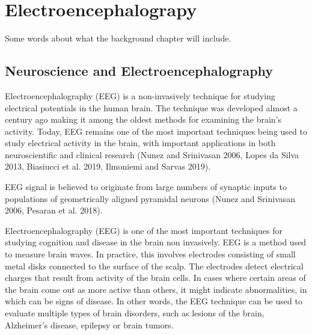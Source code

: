 \documentclass[a4paper, UKenglish, 11pt]{uiomaster}
\begin{document}
\chapter{Electroencephalograpy}
Some words about what the background chapter will include.

\section{Neuroscience and Electroencephalography}

Electroencephalography (EEG) is a non-invasively technique for studying electrical potentials in the human brain. The technique was developed almost a century ago making it among the oldest methods for examining the brain's activity. Today, EEG remains one of the most important techniques being used to study electrical activity in the brain, with important applications in both neuroscientific and clinical research (Nunez and Srinivasan 2006, Lopes da Silva 2013, Biasiucci et al. 2019, Ilmoniemi and Sarvas 2019).

EEG signal is believed to originate from large numbers of synaptic inputs to populations of geometrically aligned pyramidal neurons (Nunez and Srinivasan 2006, Pesaran et al. 2018).

Electroencephalography (EEG) is one of the most important techniques for studying cognition and disease in the brain non invasively. EEG is a method used to measure brain waves. In practice, this involves electrodes consisting of small metal disks connected to the surface of the scalp. The electrodes detect electrical charges that result from activity of the brain cells. In cases where certain areas of the brain come out as more active than others, it might indicate abnormalities, in which can be signs of disease. In other words, the EEG technique can be used to evaluate multiple types of brain disorders, such as lesions of the brain, Alzheimer's disease, epilepsy or brain tumors.
\end{document}
